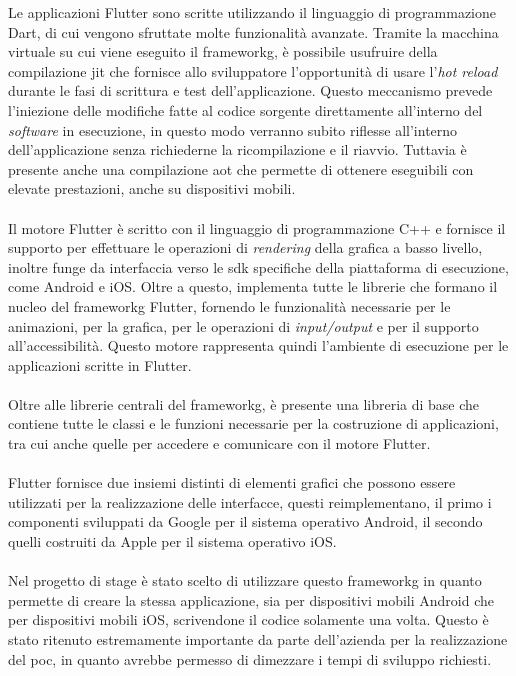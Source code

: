 Le applicazioni Flutter sono scritte utilizzando il linguaggio di programmazione Dart, di cui vengono sfruttate molte funzionalità avanzate. Tramite la macchina virtuale su cui viene eseguito il \gls{frameworkg}, è possibile usufruire della compilazione \gls{jit}\glsfirstoccur{} che fornisce allo sviluppatore l'opportunità di usare l'\textit{hot reload} durante le fasi di scrittura e test dell'applicazione. Questo meccanismo prevede l'iniezione delle modifiche fatte al codice sorgente direttamente all'interno del \textit{software} in esecuzione, in questo modo verranno subito riflesse all'interno dell'applicazione senza richiederne la ricompilazione e il riavvio. Tuttavia è presente anche una compilazione \gls{aot}\glsfirstoccur{} che permette di ottenere eseguibili con elevate prestazioni, anche su dispositivi mobili.
\\\\
Il motore Flutter è scritto con il linguaggio di programmazione C++ e fornisce il supporto per effettuare le operazioni di \textit{rendering} della grafica a basso livello, inoltre funge da interfaccia verso le \gls{sdk} specifiche della piattaforma di esecuzione, come Android e iOS. Oltre a questo, implementa tutte le librerie che formano il nucleo del \gls{frameworkg} Flutter, fornendo le funzionalità necessarie per le animazioni, per la grafica, per le operazioni di \textit{input/output} e per il supporto all'accessibilità. Questo motore rappresenta quindi l'ambiente di esecuzione per le applicazioni scritte in Flutter.
\\\\
Oltre alle librerie centrali del \gls{frameworkg}, è presente una libreria di base che contiene tutte le classi e le funzioni necessarie per la costruzione di applicazioni, tra cui anche quelle per accedere e comunicare con il motore Flutter.
\\\\
Flutter fornisce due insiemi distinti di elementi grafici che possono essere utilizzati per la realizzazione delle interfacce, questi reimplementano, il primo i componenti sviluppati da Google per il sistema operativo Android, il secondo quelli costruiti da Apple per il sistema operativo iOS.
\\\\
Nel progetto di stage è stato scelto di utilizzare questo \gls{frameworkg} in quanto permette di creare la stessa applicazione, sia per dispositivi mobili Android che per dispositivi mobili iOS, scrivendone il codice solamente una volta. Questo è stato ritenuto estremamente importante da parte dell'azienda per la realizzazione del \gls{poc}, in quanto avrebbe permesso di dimezzare i tempi di sviluppo richiesti.

